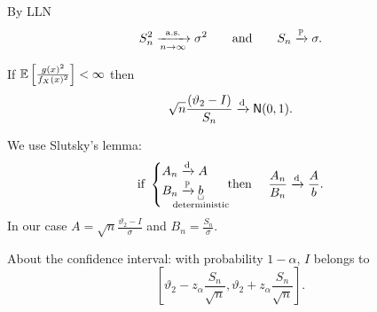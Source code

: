 \documentclass[12pt]{report}
\begin{document}
By LLN
\begin{equation*}
	S_n^{2}\xrightarrow[n\to\infty]{\mathrm{a.s.}}\sigma^{2}\qquad\text{and}\qquad S_n\xrightarrow[]{\mathbb{P}}\sigma.
\end{equation*}
\begin{corollary}
	If $\mathbb{E}\left[\frac{g(x)^{2}}{f_X(x)^{2}}\right]<\infty$ then
	\begin{equation*}
		\sqrt{n}\frac{(\vartheta_2-I)}{S_n}\xrightarrow[]{\text{d}}\mathsf{N}(0,1).
	\end{equation*}
\end{corollary}
\begin{fancyproof}
	We use Slutsky's lemma:
	\begin{equation*}
		\text{if }\begin{cases}
			A_{n}\convd A\\
			B_{n}\convpr \ubracketthin{b}_{\claptext{deterministic}}
		\end{cases}\text{ then }\quad \frac{A_{n}}{B_{n}}\convd\frac{A}{b}.
	\end{equation*}
	In our case $A=\sqrt{n}\frac{\vartheta_2-I}{\sigma}$ and $B_{n}=\frac{S_{n}}{\sigma}$.
\end{fancyproof}
About the confidence interval: with probability $1-\alpha$, $I$ belongs to
\begin{equation*}
	\left[\vartheta_2-z_{\alpha}\frac{S_n}{\sqrt{n}},\vartheta_2+z_\alpha\frac{S_{n}}{\sqrt{n}}\right].
\end{equation*}
\end{document}
